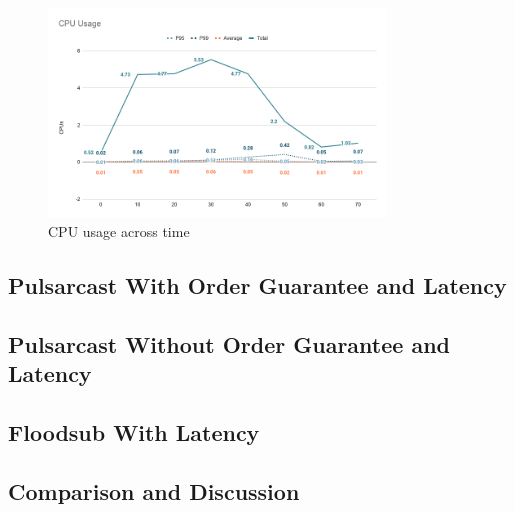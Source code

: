 \begin{figure}[!htb]
  \centering
  \includegraphics[width=0.8\textwidth]{img/graph-floodsub-cpu.png}
  \caption{CPU usage across time}
  \label{fig:graph-floodsub-cpu}
\end{figure}

\subsection{Pulsarcast With Order Guarantee and Latency}\label{subsec:pulsarcast-with-order-guarantee-and-latency}

\subsection{Pulsarcast Without Order Guarantee and Latency}\label{subsec:pulsarcast-without-order-guarantee-and-latency}

\subsection{Floodsub With Latency}\label{subsec:floodsub-with-latency}

\subsection{Comparison and Discussion}\label{subsec:comparison}
